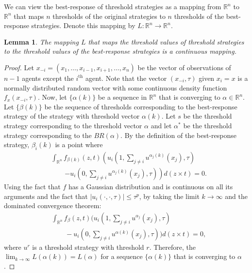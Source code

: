 \documentclass[12pt]{book}
\newtheorem{lemma}{Lemma}
\newcommand{\R}{\mathbb{R}}    %
\begin{document}
We can view the best-response of threshold strategies as a mapping from $\R^n$ to $\R^n$ that maps $n$ thresholds of the original strategies to $n$ thresholds of the best-response strategies. Denote this mapping by $L:\R^n\to\R^n$.
\begin{lemma}\label{lemma:continuous}
The mapping $L$ that maps the threshold values of threshold strategies to the threshold values of the best-response strategies is a continuous mapping. 
\end{lemma}


\begin{proof}
Let $x_{-i}=(x_1,\ldots,x_{i-1},x_{i+1},\ldots,x_n)$ be the vector of observations of $n-1$ agents except the $i^{\text{th}}$ agent. Note that the vector $(x_{-i},\tau)$ given $x_i=x$ is a normally distributed random vector with some continuous density function $f_{x}(x_{-i},\tau)$. Now, let $\{\alpha(k)\}$ be a sequence in $\R^n$ that is converging to $\alpha\in\R^n$. Let $\{\beta(k)\}$ be the sequence of thresholds corresponding to the best-response strategy of the strategy with threshold vector $\alpha(k)$. Let $s$ be the threshold strategy corresponding to the threshold vector $\alpha$ and let $\alpha^*$ be the threshold strategy corresponding to the $BR(\alpha)$. By the definition of the best-response strategy, $\beta_i(k)$ is a point where 
\begin{align}
&\int_{\R^{n}}f_{\beta(k)}(z,t)\left(u_i(1,\sum_{j\not=i}u^{\alpha_j(k)}(x_j),\tau)\right.\\
&\qquad\left.-u_i(0,\sum_{j\not=i}u^{\alpha_j(k)}(x_j),\tau)\right)d(z\times t)=0.
\end{align}
Using the fact that $f$ has a Gaussian distribution and is continuous on all its arguments and the fact that $|u_i(\cdot,\cdot,\tau)|\leq \tau^p$, by taking the limit $k\to\infty$ and the dominated convergence theorem:
\begin{align}
&\int_{\R^{n}}f_{\beta}(z,t)(u_i(1,\sum_{j\not=i}u^{\alpha_j}(x_j),\tau)\\ 
&\qquad-u_i(0,\sum_{j\not=i}u^{\alpha(k)}(x_j),\tau))d(z\times t)=0,
\end{align}
where $u^{r}$ is a threshold strategy with threshold $r$. Therefore, the $\lim_{k\to\infty}L(\alpha(k))=L(\alpha)$ for a sequence $\{\alpha(k)\}$ that is converging to $\alpha$.
\end{proof}
\end{document}

